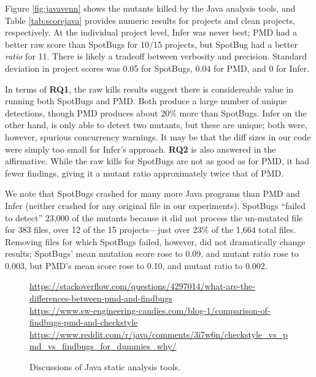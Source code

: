 Figure \ref{fig:javavenn} shows the mutants killed by the Java analysis tools, and Table \ref{tab:scorejava} provides numeric results for projects and clean projects, respectively.  At the individual project level, Infer was never best; PMD had a better raw score than SpotBugs for 10/15 projects, but SpotBug had a better \emph{ratio} for 11.  There is likely a tradeoff between verbosity and precision.  Standard deviation in project scores was 0.05 for SpotBugs, 0.04 for PMD, and 0 for Infer.

In terms of {\bf RQ1}, the raw kills results suggest there is considereable value in running both SpotBugs and PMD.  Both produce a large number of unique detections, though PMD produces about 20\% more than SpotBugs.
Infer on the other hand, is only able to detect two mutants, but these are unique; both were, however, spurious concurrency warnings.  It may be that the diff sizes in our code were simply too small for Infer's approach.
{\bf RQ2} is also answered in the affirmative.  While the raw kills for SpotBugs are not as good as for PMD, it had fewer findings, giving it a mutant ratio approximately twice that of PMD.

We note that SpotBugs crashed for many more Java programs than PMD and Infer (neither crashed for any original file in our experiments).  SpotBugs ``failed to detect'' 23,000 of the mutants because it did not process the un-mutated file for 383 files, over 12 of the 15 projects---just over 23\% of the 1,664 total files.  Removing files for which SpotBugs failed, however, did not dramatically change results; SpotBugs' mean mutation score rose to 0.09, and mutant ratio rose to 0.003, but PMD's mean score rose to 0.10, and mutant ratio to 0.002.

\begin{figure}
  {\scriptsize
    \raggedright    
  \url{https://stackoverflow.com/questions/4297014/what-are-the-differences-between-pmd-and-findbugs} \\
  \url{https://www.sw-engineering-candies.com/blog-1/comparison-of-findbugs-pmd-and-checkstyle} \\
  \url{https://www.reddit.com/r/java/comments/3i7w6n/checkstyle_vs_pmd_vs_findbugs_for_dummies_why/} \\
  }
\caption{Discussions of Java static analysis tools.}
\label{fig:blog}
\end{figure}

